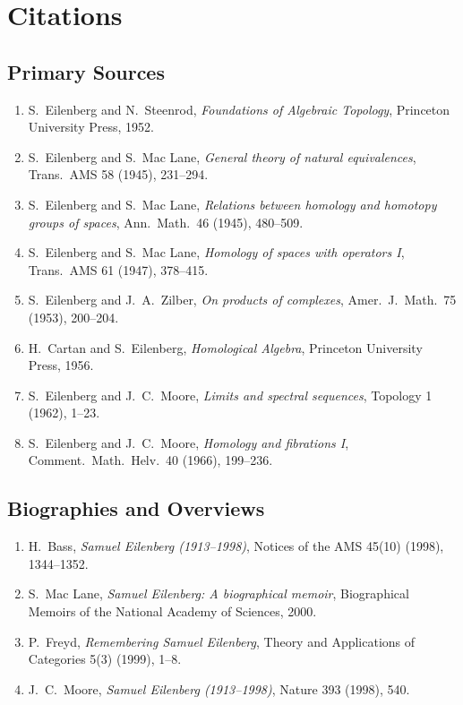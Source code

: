 \section{Citations}\subsection*{Primary Sources}
\begin{enumerate}
    \item S.\ Eilenberg and N.\ Steenrod, \textit{Foundations of Algebraic Topology}, Princeton University Press, 1952.
    \item S.\ Eilenberg and S.\ Mac Lane, \textit{General theory of natural equivalences}, Trans.\ AMS 58 (1945), 231--294.
    \item S.\ Eilenberg and S.\ Mac Lane, \textit{Relations between homology and homotopy groups of spaces}, Ann.\ Math.\ 46 (1945), 480--509.
    \item S.\ Eilenberg and S.\ Mac Lane, \textit{Homology of spaces with operators I}, Trans.\ AMS 61 (1947), 378--415.
    \item S.\ Eilenberg and J.\ A.\ Zilber, \textit{On products of complexes}, Amer.\ J.\ Math.\ 75 (1953), 200--204.
    \item H.\ Cartan and S.\ Eilenberg, \textit{Homological Algebra}, Princeton University Press, 1956.
    \item S.\ Eilenberg and J.\ C.\ Moore, \textit{Limits and spectral sequences}, Topology 1 (1962), 1--23.
    \item S.\ Eilenberg and J.\ C.\ Moore, \textit{Homology and fibrations I}, Comment.\ Math.\ Helv.\ 40 (1966), 199--236.
\end{enumerate}

\subsection*{Biographies and Overviews}
\begin{enumerate}
    \item H.\ Bass, \textit{Samuel Eilenberg (1913--1998)}, Notices of the AMS 45(10) (1998), 1344--1352.
    \item S.\ Mac Lane, \textit{Samuel Eilenberg: A biographical memoir}, Biographical Memoirs of the National Academy of Sciences, 2000.
    \item P.\ Freyd, \textit{Remembering Samuel Eilenberg}, Theory and Applications of Categories 5(3) (1999), 1--8.
    \item J.\ C.\ Moore, \textit{Samuel Eilenberg (1913--1998)}, Nature 393 (1998), 540.
\end{enumerate}

